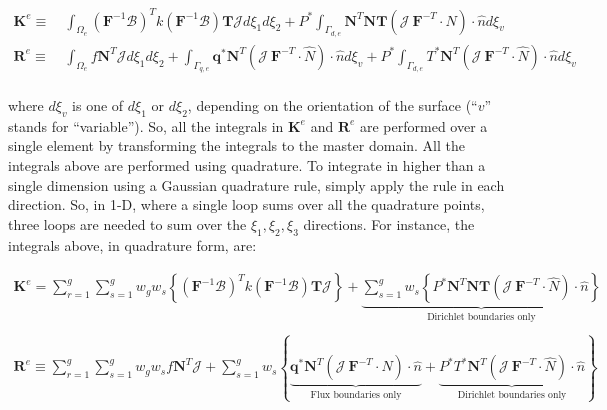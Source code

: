 \documentclass[10pt]{article}
\begin{document}
\begin{equation}
\label{eq:MasterDomain}
\begin{aligned}
\textbf{K}^e\equiv&\ \int_{\Omega_e}(\textbf{F}^{-1}\mathscr{B})^Tk(\textbf{F}^{-1}\mathscr{B})\textbf{T} \mathscr{J}d\xi_1d\xi_2+P^{*}\int_{\Gamma_{d,e}}\textbf{N}^T\textbf{N}\textbf{T}(\mathscr{J}\ \textbf{F}^{-T}\cdot\hat{N})\cdot\hat{n}d\xi_v\\
\textbf{R}^e\equiv&\ \int_{\Omega_e}f\textbf{N}^T \mathscr{J}d\xi_1d\xi_2+\int_{\Gamma_{q,e}}\textbf{q}^{*}\textbf{N}^T (\mathscr{J}\ \textbf{F}^{-T}\cdot\hat{N})\cdot\hat{n}d\xi_v+P^{*}\int_{\Gamma_{d,e}}T^{*}\textbf{N}^T (\mathscr{J}\ \textbf{F}^{-T}\cdot\hat{N})\cdot\hat{n}d\xi_v\\
\end{aligned}
\end{equation}

where \(d\xi_v\) is one of \(d\xi_1\) or \(d\xi_2\), depending on the orientation of the surface (``\(v\)'' stands for ``variable''). So, all the integrals in \(\textbf{K}^e\) and \(\textbf{R}^e\) are performed over a single element by transforming the integrals to the master domain. All the integrals above are performed using quadrature. To integrate in higher than a single dimension using a Gaussian quadrature rule, simply apply the rule in each direction. So, in 1-D, where a single loop sums over all the quadrature points, three loops are needed to sum over the \(\xi_1,\xi_2,\xi_3\) directions. For instance, the integrals above, in quadrature form, are:

\begin{equation}
\label{eq:FEWeakForm_element3}
\begin{aligned}
\textbf{K}^e=\sum_{r=1}^g\sum_{s=1}^gw_gw_s\left\{(\textbf{F}^{-1}\mathscr{B})^Tk(\textbf{F}^{-1}\mathscr{B})\textbf{T} \mathscr{J}\right\} +\underbrace{\sum_{s=1}^gw_s\left\{P^{*}\textbf{N}^T\textbf{N}\textbf{T}(\mathscr{J}\ \textbf{F}^{-T}\cdot\hat{N})\cdot\hat{n}\right\}}_\text{Dirichlet boundaries only}\\
\ \\
\textbf{R}^e\equiv\sum_{r=1}^g\sum_{s=1}^gw_gw_sf\textbf{N}^T \mathscr{J}+\sum_{s=1}^gw_s\left\{\underbrace{\textbf{q}^{*}\textbf{N}^T (\mathscr{J}\ \textbf{F}^{-T}\cdot\hat{N})\cdot\hat{n}}_\text{Flux boundaries only}+\underbrace{P^{*}T^{*}\textbf{N}^T (\mathscr{J}\ \textbf{F}^{-T}\cdot\hat{N})\cdot\hat{n}}_\text{Dirichlet boundaries only}\right\}\\
\end{aligned}
\end{equation}
\end{document}
